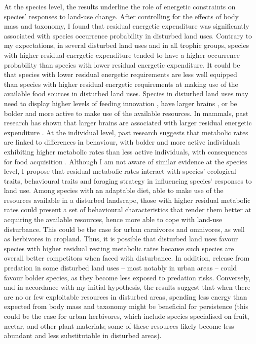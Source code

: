 At the species level, the results underline the role of energetic constraints on species' responses to land-use change. After controlling for the effects of body mass and taxonomy, I found that residual energetic expenditure was significantly associated with species occurrence probability in disturbed land uses. Contrary to my expectations, in several disturbed land uses and in all trophic groups, species with higher residual energetic expenditure tended to have a higher occurrence probability than species with lower residual energetic expenditure. It could be that species with lower residual energetic requirements are less well equipped than species with higher residual energetic requirements at making use of the available food sources in disturbed land uses. Species in disturbed land uses may need to display higher levels of feeding innovation \citep{Coogan2018}, have larger brains \citep{Sayol2020}, or be bolder and more active to make use of the available resources. In mammals, past research has shown that larger brains are associated with larger residual energetic expenditure \citep{Isler2006}. At the individual level, past research suggests that metabolic rates are linked to differences in behaviour, with bolder and more active individuals exhibiting higher metabolic rates than less active individuals, with consequences for food acquisition \citep{Biro2010}. Although I am not aware of similar evidence at the species level, I propose that residual metabolic rates interact with species’ ecological traits, behavioural traits and foraging strategy in influencing species' responses to land use. Among species with an adaptable diet, able to make use of the resources available in a disturbed landscape, those with higher residual metabolic rates could present a set of behavioural characteristics that render them better at acquiring the available resources, hence more able to cope with land-use disturbance. This could be the case for urban carnivores and omnivores, as well as herbivores in cropland. Thus, it is possible that disturbed land uses favour species with higher residual resting metabolic rates because such species are overall better competitors when faced with disturbance. In addition, release from predation in some disturbed land uses – most notably in urban areas – could favour bolder species, as they become less exposed to predation risks. Conversely, and in accordance with my initial hypothesis, the results suggest that when there are no or few exploitable resources in disturbed areas, spending less energy than expected from body mass and taxonomy might be beneficial for persistence (this could be the case for urban herbivores, which include species specialised on fruit, nectar, and other plant materials; some of these resources likely become less abundant and less substitutable in disturbed areas).

